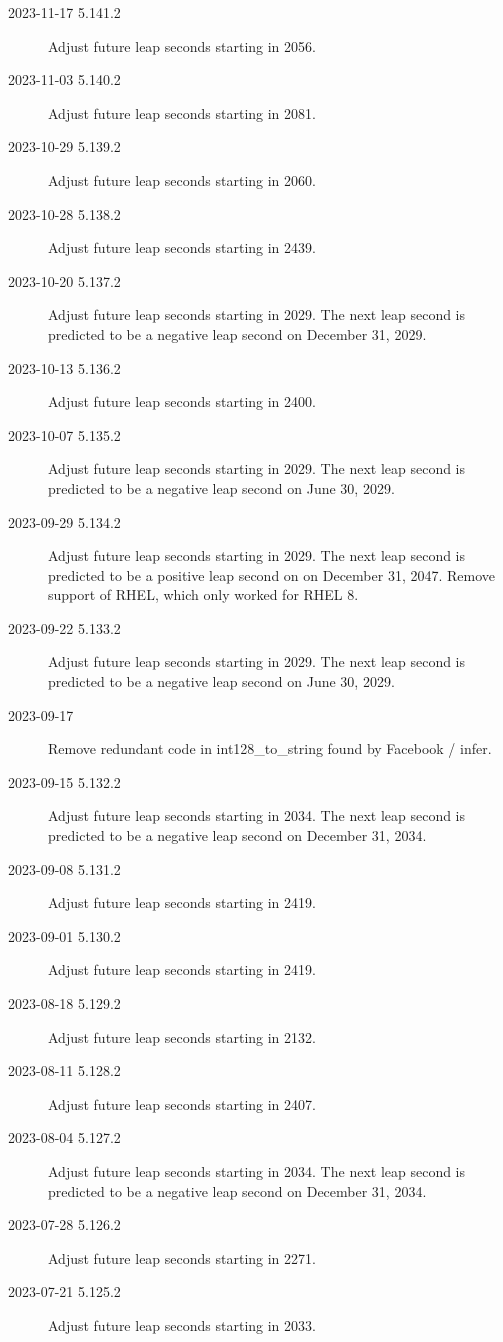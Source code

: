 \documentclass[letterpaper,twoside]{article}
\begin{document}
\begin{description}
\item[2023-11-17 5.141.2]Adjust future leap seconds starting in 2056.
\item[2023-11-03 5.140.2]Adjust future leap seconds starting in 2081.
\item[2023-10-29 5.139.2]Adjust future leap seconds starting in 2060.
\item[2023-10-28 5.138.2]Adjust future leap seconds starting in 2439.
\item[2023-10-20 5.137.2]Adjust future leap seconds starting in 2029.
  The next leap second is predicted to be a negative leap second
  on December 31, 2029.
\item[2023-10-13 5.136.2]Adjust future leap seconds starting in 2400.
\item[2023-10-07 5.135.2]Adjust future leap seconds starting in 2029.
  The next leap second is predicted to be a negative leap second
  on June 30, 2029.
\item[2023-09-29 5.134.2]Adjust future leap seconds starting in 2029.
  The next leap second is predicted to be a positive leap second
  on on December 31, 2047.
  Remove support of RHEL, which only worked for RHEL 8.
\item[2023-09-22 5.133.2]Adjust future leap seconds starting in 2029.
  The next leap second is predicted to be a negative leap second
  on June 30, 2029.
\item[2023-09-17]Remove redundant code in int128\_to\_string
  found by Facebook / infer.
\item[2023-09-15 5.132.2]Adjust future leap seconds starting in 2034.
  The next leap second is predicted to be a negative leap second
  on December 31, 2034.
\item[2023-09-08 5.131.2]Adjust future leap seconds starting in 2419.
\item[2023-09-01 5.130.2]Adjust future leap seconds starting in 2419.
\item[2023-08-18 5.129.2]Adjust future leap seconds starting in 2132.
\item[2023-08-11 5.128.2]Adjust future leap seconds starting in 2407.
\item[2023-08-04 5.127.2]Adjust future leap seconds starting in 2034.
  The next leap second is predicted to be a negative leap second
  on December 31, 2034.
\item[2023-07-28 5.126.2]Adjust future leap seconds starting in 2271.
\item[2023-07-21 5.125.2]Adjust future leap seconds starting in 2033.

\end{description}
\end{document}
